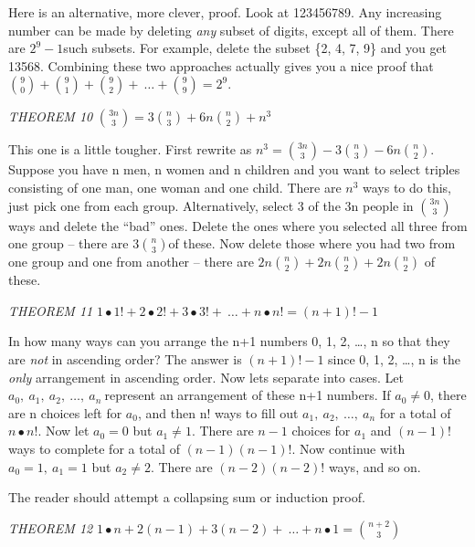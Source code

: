 \documentclass[10pt,letter]{article}
\begin{document}
Here is an alternative, more clever, proof. Look at 123456789. Any
increasing number can be made by deleting \emph{any} subset of digits,
except all of them. There are \(2^{9} - 1\)such subsets. For example,
delete the subset \{2, 4, 7, 9\} and you get 13568. Combining these two
approaches actually gives you a nice proof that \(\binom{9}{0}
 +
\binom{9}{1}
 +
\binom{9}{2}
 + \ \ldots +
\binom{9}{9}
 = 2^{9}\).

\emph{THEOREM 10} \(\binom{3n}{3}
 = 3
\binom{n}{3}
 + 6n
\binom{n}{2}
 + n^{3}\)

This one is a little tougher. First rewrite as \(n^{3} =
\binom{3n}{3}
 - 3
\binom{n}{3}
 - 6n
\binom{n}{2}
\). Suppose you have n men, n women and n children and you
want to select triples consisting of one man, one woman and one child.
There are \(n^{3}\) ways to do this, just pick one from each group.
Alternatively, select 3 of the 3n people in \(\binom{3n}{3}
\) ways and delete the ``bad'' ones. Delete the ones where
you selected all three from one group -- there are \(3
\binom{n}{3}
\)of these. Now delete those where you had two from one
group and one from another -- there are \(2n
\binom{n}{2}
 + 2n
\binom{n}{2}
 + 2n
\binom{n}{2}
\) of these.

\emph{THEOREM 11}
\(1 \bullet 1! + 2 \bullet 2! + 3 \bullet 3! + \ \ldots + n \bullet n! = \left( n + 1 \right)! - 1\)

In how many ways can you arrange the n+1 numbers 0, 1, 2, \ldots{}, n so
that they are \emph{not} in ascending order? The answer is
\(\left( n + 1 \right)! - 1\) since 0, 1, 2, \ldots{}, n is the
\emph{only} arrangement in ascending order. Now lets separate into
cases. Let \(a_{0},\ a_{1},\ a_{2},\ \ldots,\ a_{n}\ \)represent an
arrangement of these n+1 numbers. If \(a_{0} \neq 0\), there are n
choices left for \(a_{0}\), and then n! ways to fill out
\(a_{1},\ a_{2},\ \ldots,\ a_{n}\) for a total of \(n \bullet n!\). Now
let \(a_{0} = 0\) but \(a_{1} \neq 1\). There are \(n - 1\) choices for
\(a_{1}\) and \(\left( n - 1 \right)!\ \)ways to complete for a total of
\(\left( n - 1 \right)\left( n - 1 \right)!\). Now continue with
\(a_{0} = 1,\ a_{1} = 1\) but \(a_{2} \neq 2\). There are
\(\left( n - 2 \right)\left( n - 2 \right)!\) ways, and so on.

The reader should attempt a collapsing sum or induction proof.

\emph{THEOREM 12}
\(1 \bullet n + 2\left( n - 1 \right) + 3\left( n - 2 \right) + \ \ldots + n \bullet 1 =
\binom{n + 2}{3}
\)
\end{document}
